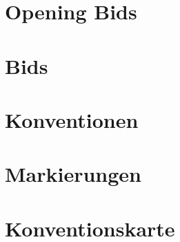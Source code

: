 \documentclass[12pt,a4paper,titlepage,xcolor=dvipsnames,bibliography=totoc, listof=totoc]{scrartcl}
\begin{document}
\label{Begin Document}		%
\label{Titlepage}	%
\cleardoublepage{}\tableofcontents
\newpage \label{Table of Contents}		%


\section{Opening Bids}














\section{Bids}






\section{Konventionen}








\section{Markierungen}
%

\section{Konventionskarte}




\label{End Document}
\end{document}
